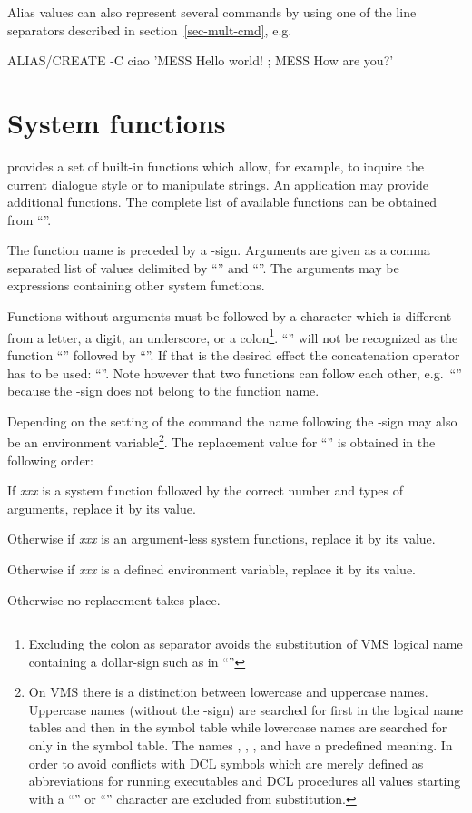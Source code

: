 Alias values can also represent several commands by using one of the
line separators described in section~\ref{sec-mult-cmd}, e.g.\
\begin{XMP}
ALIAS/CREATE -C ciao 'MESS Hello world! ; MESS How are you?'
\end{XMP}

%
%
\section{System functions}

\KUIP{} provides a set of built-in functions which allow, for example, to
inquire the current dialogue style or to manipulate strings.
An application may provide additional functions.
The complete list of available functions can be obtained from 
``''.

The function name is preceded by a \Lit{$}-sign.
Arguments are given as a comma separated
list of values delimited by ``\Lit{(}'' and ``\Lit{)}''.
The arguments may be expressions containing other system functions.

Functions without arguments must be followed by a character which is
different from a letter, a digit, an underscore, or a colon\footnote{
Excluding the colon as separator avoids the substitution of VMS
logical name containing a dollar-sign such as in 
``''
}.
``'' will not be recognized as the function
``'' followed by ``''.
If that is the desired effect the concatenation operator has to be used:
``\Lit{$OS//MOSIS}''. 
Note however that two functions can follow each other, e.g.\
``'' because the \Lit{$}-sign does
not belong to the function name.

Depending on the setting of the  command
the name following the \Lit{$}-sign may also be an environment
variable\footnote{
On VMS there is a distinction between lowercase and uppercase names.
Uppercase names (without the \Lit{\$}-sign) are searched for first in
the logical name tables and then in the symbol table while lowercase
names are searched for only in the symbol table.
The names \Lit{HOME}, \Lit{PATH}, \Lit{TERM}, and \Lit{USER} have a
predefined meaning.
In order to avoid conflicts with DCL symbols which are merely defined
as abbreviations for running executables and DCL procedures all values
starting with a ``\Lit{\$}'' or ``\Lit{@}'' character are excluded
from substitution.
}.
The replacement value for ``'' is obtained in the
following order:
\begin{OL}
\item
If \textsl{xxx} is a system function followed by the correct
number and types of arguments, replace it by its value.
\item
Otherwise if \textsl{xxx} is an argument-less system functions, replace it by
its value.
\item
Otherwise if \textsl{xxx} is a defined environment variable, replace it
by its value.
\item
Otherwise no replacement takes place.
\end{OL}


